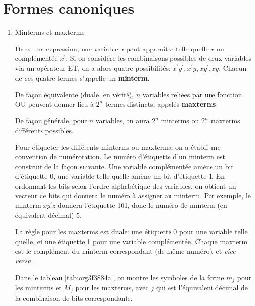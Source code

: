 \documentclass[letter, oneside]{book}
\begin{document}
\section{Formes canoniques}
\label{sec:org7fdec47}

\begin{enumerate}
\item Minterms et maxterms
\label{sec:org57f62a0}

Dans une expression, une variable \(x\) peut apparaître telle quelle
\(x\) ou complémentée \(x^\prime\). Si on considère les combinaisons
possibles de deux variables via un opérateur ET, on a alors quatre
possibilités: \(x^\prime y^\prime, x^\prime y, x y^\prime,x
y\). Chacun de ces quatre termes s'appelle un \textbf{minterm}.

De façon équivalente (duale, en vérité), \(n\) variables reliées par
une fonction OU peuvent donner lieu à \(2^n\) termes distincts,
appelés \textbf{maxterms}. 

De façon générale, pour \(n\) variables, on aura \(2^n\) minterms ou
\(2^n\) maxterms différents possibles.

Pour étiqueter les différents minterms ou maxterms, on a établi une
convention de numérotation. Le numéro d'étiquette d'un minterm est
construit de la façon suivante. Une variable complémentée amène un bit
d'étiquette 0, une variable telle quelle amène un bit d'étiquette 1.
En ordonnant les bits selon l'ordre alphabétique des variables, on
obtient un vecteur de bits qui donnera le numéro à assigner au
minterm.  Par exemple, le minterm \(x y^\prime z\) donnera l'étiquette
101, donc le numéro de minterm (en équivalent décimal) 5.

La règle pour les maxterms est duale: une étiquette 0 pour une
variable telle quelle, et une étiquette 1 pour une variable
complémentée. Chaque maxterm est le complément du minterm
correspondant (de même numéro), et \emph{vice versa}.

Dans le tableau \ref{tab:org3f3884a}, on montre les symboles de la forme
\(m_j\) pour les minterms et \(M_j\) pour les maxterms, avec \(j\) qui
est l'équivalent décimal de la combinaison de bits correspondante.


\end{enumerate}
\end{document}
